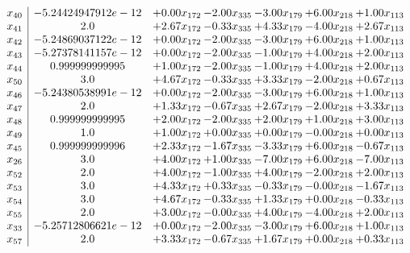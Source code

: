 \documentclass[8pt]{article}
\begin{document}
\[\begin{array}{c| c c@{\hskip 2pt} c@{\hskip 2pt} c@{\hskip 2pt} c@{\hskip 2pt} c@{\hskip 2pt} }
 x_{40}   &  -5.24424947912e-12 & +  0.00 x_{172} & -2.00 x_{335} & -3.00 x_{179} & +  6.00 x_{218} & +  1.00 x_{113}\\
 x_{41}   &  2.0 & +  2.67 x_{172} & -0.33 x_{335} & +  4.33 x_{179} & -4.00 x_{218} & +  2.67 x_{113}\\
 x_{42}   &  -5.24869037122e-12 & +  0.00 x_{172} & -2.00 x_{335} & -3.00 x_{179} & +  6.00 x_{218} & +  1.00 x_{113}\\
 x_{43}   &  -5.27378141157e-12 & +  0.00 x_{172} & -2.00 x_{335} & -1.00 x_{179} & +  4.00 x_{218} & +  2.00 x_{113}\\
 x_{44}   &  0.999999999995 & +  1.00 x_{172} & -2.00 x_{335} & -1.00 x_{179} & +  4.00 x_{218} & +  2.00 x_{113}\\
 x_{50}   &  3.0 & +  4.67 x_{172} & -0.33 x_{335} & +  3.33 x_{179} & -2.00 x_{218} & +  0.67 x_{113}\\
 x_{46}   &  -5.24380538991e-12 & +  0.00 x_{172} & -2.00 x_{335} & -3.00 x_{179} & +  6.00 x_{218} & +  1.00 x_{113}\\
 x_{47}   &  2.0 & +  1.33 x_{172} & -0.67 x_{335} & +  2.67 x_{179} & -2.00 x_{218} & +  3.33 x_{113}\\
 x_{48}   &  0.999999999995 & +  2.00 x_{172} & -2.00 x_{335} & +  2.00 x_{179} & +  1.00 x_{218} & +  3.00 x_{113}\\
 x_{49}   &  1.0 & +  1.00 x_{172} & +  0.00 x_{335} & +  0.00 x_{179} & -0.00 x_{218} & +  0.00 x_{113}\\
 x_{45}   &  0.999999999996 & +  2.33 x_{172} & -1.67 x_{335} & -3.33 x_{179} & +  6.00 x_{218} & -0.67 x_{113}\\
 x_{26}   &  3.0 & +  4.00 x_{172} & +  1.00 x_{335} & -7.00 x_{179} & +  6.00 x_{218} & -7.00 x_{113}\\
 x_{52}   &  2.0 & +  4.00 x_{172} & -1.00 x_{335} & +  4.00 x_{179} & -2.00 x_{218} & +  2.00 x_{113}\\
 x_{53}   &  3.0 & +  4.33 x_{172} & +  0.33 x_{335} & -0.33 x_{179} & -0.00 x_{218} & -1.67 x_{113}\\
 x_{54}   &  3.0 & +  4.67 x_{172} & -0.33 x_{335} & +  1.33 x_{179} & +  0.00 x_{218} & -0.33 x_{113}\\
 x_{55}   &  2.0 & +  3.00 x_{172} & -0.00 x_{335} & +  4.00 x_{179} & -4.00 x_{218} & +  2.00 x_{113}\\
 x_{33}   &  -5.25712806621e-12 & +  0.00 x_{172} & -2.00 x_{335} & -3.00 x_{179} & +  6.00 x_{218} & +  1.00 x_{113}\\
 x_{57}   &  2.0 & +  3.33 x_{172} & -0.67 x_{335} & +  1.67 x_{179} & +  0.00 x_{218} & +  0.33 x_{113}\\

\end{array}\]
\end{document}

